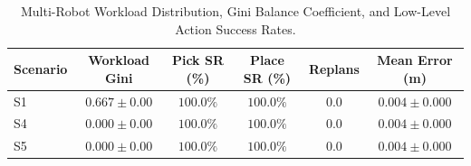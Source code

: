 \begin{table}[t]
\centering
\caption{Multi-Robot Workload Distribution, Gini Balance Coefficient, and Low-Level Action Success Rates.}
\label{tab:robot_coordination}
\begin{tabular}{lccccc}
\toprule
\textbf{Scenario} & \textbf{Workload Gini} & \textbf{Pick SR (\%)} & \textbf{Place SR (\%)} & \textbf{Replans} & \textbf{Mean Error (m)} \\
\midrule
S1 & $0.667 \pm 0.00$ & $100.0\%$ & $100.0\%$ & $0.0$ & $0.004 \pm 0.000$ \\
S4 & $0.000 \pm 0.00$ & $100.0\%$ & $100.0\%$ & $0.0$ & $0.004 \pm 0.000$ \\
S5 & $0.000 \pm 0.00$ & $100.0\%$ & $100.0\%$ & $0.0$ & $0.004 \pm 0.000$ \\
\bottomrule
\end{tabular}
\end{table}